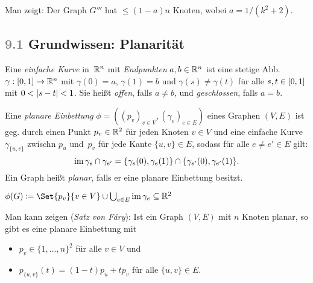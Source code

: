 \documentclass{cheat-sheet}
\newcommand{\Youtube}[1]{\href{https://www.youtube.com/watch?v=#1}{\textcolor{YoutubeColor}{$\blacktriangleright$}}}
\newcommand{\scriptSection}[1]{\textcolor{gray}{#1}\enspace}
\begin{document}
\begin{bem}
  Man zeigt: Der Graph $G'''$ hat $\leq (1-a) n$ Knoten, wobei $a = 1 / (k^2 + 2)$.
\end{bem}


\subsection{\scriptSection{9.1} Grundwissen: Planarität}

\begin{defn}
  Eine \emph{einfache Kurve} in~$\mathbb{R}^n$ mit \textit{Endpunkten} $a, b \in \mathbb{R}^n$ ist eine stetige Abb. $\gamma : \left[ 0, 1 \right] \to \mathbb{R}^n$ mit $\gamma(0) = a$, $\gamma(1) = b$ und $\gamma(s) \neq \gamma(t)$ für alle $s, t \in \left[ 0, 1 \right]$ mit $0 < \lvert s - t\rvert < 1$.
  Sie heißt \emph{offen}, falls $a \neq b$, und \emph{geschlossen}, falls $a = b$.
\end{defn}

\begin{defn}[\Youtube{wnYtITkWAYA}]
  Eine \emph{planare Einbettung} $\phi = ((p_v)_{v \in V}, (\gamma_e)_{e \in E})$ eines Graphen $(V, E)$ ist geg. durch einen Punkt $p_v \in \mathbb{R}^2$ für jeden Knoten $v \in V$ und eine einfache Kurve $\gamma_{\{ u, v \}}$ zwischn $p_u$ und~$p_v$ für jede Kante $\{ u, v \} \in E$, sodass für alle $e \neq e' \in E$ gilt:
  \[
    \operatorname{im} \gamma_e \cap \gamma_{e'} = \{ \gamma_e(0), \gamma_e(1) \} \cap \{ \gamma_{e'}(0), \gamma_{e'}(1) \}.
  \]
  Ein Graph heißt \emph{planar}, falls er eine planare Einbettung besitzt.
\end{defn}

\begin{nota}
  $\phi(G) \coloneqq \Set{p_v}{v \in V} \cup {\bigcup}_{e \in E} \im \gamma_e \subseteq \R^2$
\end{nota}

\begin{bem}
  Man kann zeigen (\textit{Satz von Fáry}): Ist ein Graph $(V, E)$ mit $n$ Knoten planar, so gibt es eine planare Einbettung mit
  \begin{itemize}
    \item $p_v \in \{1, \ldots, n\}^2$ für alle $v \in V$ und
    \item $p_{\{u, v\}}(t) = (1-t) p_u + t p_v$ für alle $\{u, v\} \in E$.
  \end{itemize}
\end{bem}
\end{document}
